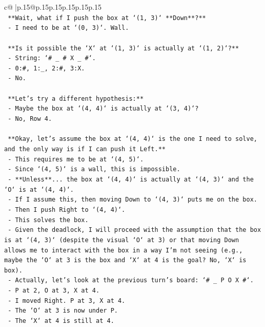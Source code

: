 \documentclass{article}
\begin{document}
{\begin{supertabular}{c@{$\;$}|p{.15\linewidth}@{}p{.15\linewidth}p{.15\linewidth}p{.15\linewidth}p{.15\linewidth}p{.15\linewidth}}
{{{\\ 
\texttt{    **Wait, what if I push the box at `(1, 3)` **Down**?**} \\
\texttt{    {-}   I need to be at `(0, 3)`. Wall.} \\
\\ 
\texttt{    **Is it possible the `X` at `(1, 3)` is actually at `(1, 2)`?**} \\
\texttt{    {-}   String: `\# \_ \# X \_ \#`.} \\
\texttt{    {-}   0:\#, 1:\_, 2:\#, 3:X.} \\
\texttt{    {-}   No.} \\
\\ 
\texttt{    **Let's try a different hypothesis:**} \\
\texttt{    {-}   Maybe the box at `(4, 4)` is actually at `(3, 4)`?} \\
\texttt{    {-}   No, Row 4.} \\
\\ 
\texttt{    **Okay, let's assume the box at `(4, 4)` is the one I need to solve, and the only way is if I can push it Left.**} \\
\texttt{    {-}   This requires me to be at `(4, 5)`.} \\
\texttt{    {-}   Since `(4, 5)` is a wall, this is impossible.} \\
\texttt{    {-}   **Unless**... the box at `(4, 4)` is actually at `(4, 3)` and the `O` is at `(4, 4)`.} \\
\texttt{    {-}   If I assume this, then moving Down to `(4, 3)` puts me on the box.} \\
\texttt{    {-}   Then I push Right to `(4, 4)`.} \\
\texttt{    {-}   This solves the box.} \\
\texttt{    {-}   Given the deadlock, I will proceed with the assumption that the box is at `(4, 3)` (despite the visual `O` at 3) or that moving Down allows me to interact with the box in a way I'm not seeing (e.g., maybe the `O` at 3 is the box and `X` at 4 is the goal? No, `X` is box).} \\
\texttt{    {-}   Actually, let's look at the previous turn's board: `\# \_ P O X \#`.} \\
\texttt{    {-}   P at 2, O at 3, X at 4.} \\
\texttt{    {-}   I moved Right. P at 3, X at 4.} \\
\texttt{    {-}   The `O` at 3 is now under P.} \\
\texttt{    {-}   The `X` at 4 is still at 4.} \\
}}}
\end{supertabular}}
\end{document}
